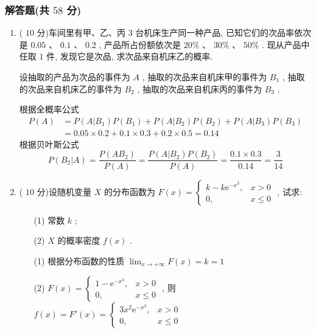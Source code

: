 \documentclass[cn,11pt,fancy,hide]{elegantbook}
\newcommand{\ee}{\mathrm{e}}
\renewcommand{\leq}{\leqslant}
\begin{document}
\subsubsection{解答题(共 $58$ 分)}
\begin{enumerate}
	\item ( $10$ 分)车间里有甲、乙、丙 $3$ 台机床生产同一种产品, 已知它们的次品率依次是 $0.05$ 、 $0.1$ 、 $0.2$ , 产品所占份额依次是 $20\%$ 、 $30\%$ 、 $50\%$ . 现从产品中任取 $1$ 件, 发现它是次品, 求次品来自机床乙的概率.
	\begin{solution}
		设抽取的产品为次品的事件为 $A$ , 抽取的次品来自机床甲的事件为 $B_1$ , 抽取的次品来自机床乙的事件为 $B_2$ , 抽取的次品来自机床丙的事件为 $B_3$ .
		
		根据全概率公式
		\begin{equation*}
			\begin{aligned}
			P(A)&=P(A|B_1)P(B_1)+P(A|B_2)P(B_2)+P(A|B_3)P(B_3)\\
			&=0.05\times0.2+0.1\times0.3+0.2\times0.5=0.14
			\end{aligned}
		\end{equation*}
		根据贝叶斯公式
		\begin{equation*}
			P(B_2|A)=\frac{P(AB_2)}{P(A)}=\frac{P(A|B_2)P(B_2)}{P(A)}=\frac{0.1\times0.3}{0.14}=\frac{3}{14}
		\end{equation*}
	\end{solution}
	
	\item ( $10$ 分)设随机变量 $X$ 的分布函数为 $F(x)=
	\begin{cases}
	k-k\ee^{-x^3}, & x>0\\
	0, & x\leq0
	\end{cases}
	$ , 试求:
	\begin{enumerate}
		\item[(1)] 常数 $k$ ;
		\item[(2)] $X$ 的概率密度 $f(x)$ .
	\end{enumerate}
	\begin{solution}
	  \begin{enumerate}
		\item[(1)] 根据分布函数的性质 $\lim_{x\to+\infty}F(x)=k=1$
		\item[(2)] $F(x)=
		\begin{cases}
		1-\ee^{-x^3}, & x>0\\
		0, & x\leq0 
		\end{cases}
		$ , 则$f(x)=F'(x)=
		\begin{cases}
		3x^2\ee^{-x^3}, & x>0\\
		0, & x\leq0
		\end{cases}
		$
	  \end{enumerate}
	\end{solution}


\end{enumerate}
\end{document}

